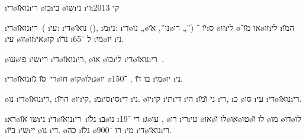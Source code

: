 \newcommand{\dinozaurim}{\i{די}\o{נו}\a{ז}\u{או}\i{רי}\x{ם}}

\textheader%
{\i{די}\o{נו}\u{או}\i{רי}}
{\o{כו}\i{בי} \o{שו}\i{ני}}
{}
{\i{וי}\i{קי}}
{}
{}
{2013}

\dinozaurim\ ( \i{עי}: \i{די}\o{נו}\u{או} (), \i{מ}\i{ני}:  \i{די}\o{נו} „\o{נו}”,  \u{או}\o{רו} „”) \u{יו} ־\i{ס}  \o{זו}\i{לי} \o{או} \u{מו}־\o{זו}\i{לי} \i{ה}\u{מו} \i{עי} \o{זו}\o{זו}\i{אי}\o{קו} \i{נ}\u{דו} \i{ל} ־65 \i{מי}\o{יו} \i{ני}.

\o{עו}\o{פו}   \i{שי}\i{רי}  \dinozaurim, \o{או}  \o{כו}\i{לי}  \dinozaurim\ .

\dinozaurim\ \u{סו} \u{גו}\o{חו} \o{קו}\o{לו}\i{ג}\o{יו} \o{בו}   \u{דו} ,  ־150 \i{מי}\o{יו} \i{ני}.

\o{נו} \dinozaurim, \i{ה}\u{חו} \o{יו}\i{קי}, \i{מ}\i{סי}\i{סי}\i{די} \i{ני}. \o{יו}\i{קי} \i{תי}\i{די} \i{הי} \i{ני} \u{ו}\u{מו} \i{רי}, \i{כ}  \o{סו} \i{עי} \dinozaurim.

\i{רא}\o{שו} \u{או}\i{ני}  \dinozaurim\ \i{נ}\u{לו} \i{ב}\o{נו} \i{רי}   ־19   \i{ג}\o{עו} , \o{רו} \i{רי}\i{טי}  \o{או}\o{לו} \u{ו}\o{או}\o{טו}\o{לו} \u{ו} \o{מו} \o{דו}\o{לו} \i{ב}\u{יו} \i{שי}\i{יי} \o{גו}  \i{די}.
 \o{כה} \i{נ}\u{לו} \o{רו} ־900 \i{מי} \dinozaurim.

